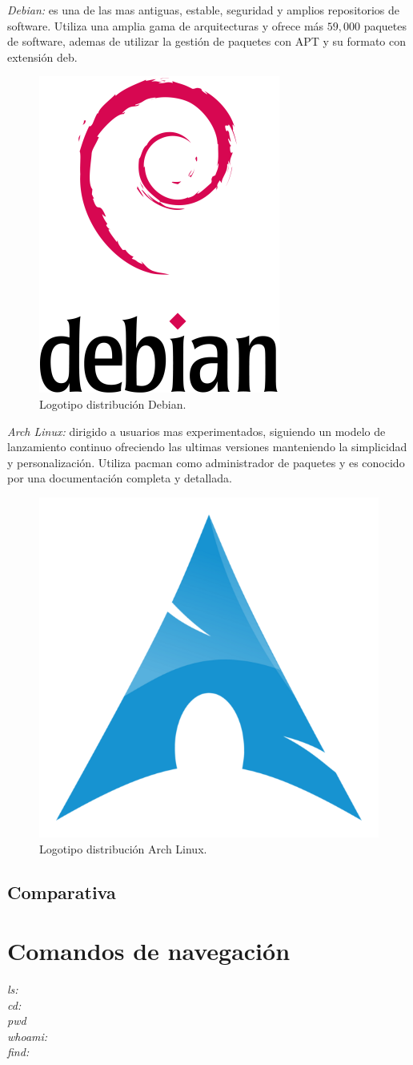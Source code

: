 \documentclass[10pt,a4paper,titlepage]{article}
\begin{document}
	\emph{Debian:} es una de las mas antiguas, estable, seguridad y amplios repositorios de software. Utiliza una amplia gama de arquitecturas y ofrece más $59,000$ paquetes de software, ademas de utilizar la gestión de paquetes con APT y su formato con extensión deb.
	\begin{figure}[H]
		\centering
		\includegraphics[width=0.3\linewidth]{"./images/debian.png"}
		\caption{Logotipo distribución Debian.}
		\label{fig:logoDebian}
	\end{figure}
	
	\emph{Arch Linux:} dirigido a usuarios mas experimentados, siguiendo un modelo de lanzamiento continuo ofreciendo las ultimas versiones manteniendo la simplicidad y personalización. Utiliza pacman como administrador de paquetes y es conocido por una documentación completa y detallada.
	\begin{figure}[H]
		\centering
		\includegraphics[width=0.3\linewidth]{"./images/arch.png"}
		\caption{Logotipo distribución Arch Linux.}
		\label{fig:logoArch}
	\end{figure}
	
	\subsection*{Comparativa}
	
	\section*{Comandos de navegación}
	\emph{ls:}
	\\
	\emph{cd:}
	\\
	\emph{pwd}
	\\
	\emph{whoami:}
	\\
	\emph{find:}
	
\end{document}
